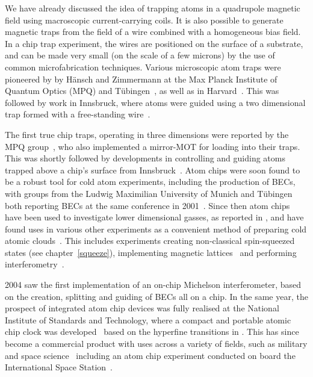 We have already discussed the idea of trapping atoms in a quadrupole magnetic
field using macroscopic current-carrying coils. It is also possible to generate
magnetic traps from the field of a wire combined with a homogeneous bias field.
In a chip trap experiment, the wires are positioned on the surface of a
substrate, and can be made very small (on the scale of a few microns) by the
use of common microfabrication techniques. Various microscopic atom traps were
pioneered by by H\"ansch and Zimmermann at the Max Planck Institute of Quantum
Optics (MPQ) and T\"ubingen~\cite{PhysRevLett.80.1634, PhysRevLett.81.5310}, as
well as in Harvard~\cite{Drindic1998}. This was followed by work in Innsbruck,
where \Li{} atoms were guided using a two dimensional trap formed with a
free-standing wire~\cite{PhysRevLett.82.2014}. 

The first true chip traps, operating in three dimensions were reported by the
MPQ group~\cite{Reichel1999}, who also implemented a mirror-MOT for loading
\esRb{} into their traps. This was shortly followed by developments in
controlling and guiding \Li{} atoms trapped above a chip's
surface from Innsbruck~\cite{Folman2000}.
%
Atom chips were soon found to be a robust tool for cold atom experiments,
including the production of BECs, with groups from the Ludwig Maximilian
University of Munich and T\"ubingen both reporting \esRb{} BECs at the same
conference in 2001~\cite{Hansel2001, Ott2001}. Since then atom chips have been
used to investigate lower dimensional gasses, as reported in
, and have found
uses in various other experiments as a convenient method of preparing cold
atomic clouds~\cite{PhysRevLett.104.073604}.
%
This includes experiments creating non-classical spin-squeezed states (see
chapter~\ref{squeeze}), implementing magnetic lattices~\cite{Gerritsma2007} and
performing interferometry~\cite{Wang2005}.

2004 saw the first implementation of an on-chip Michelson interferometer, based
on the creation, splitting and guiding of BECs all on a chip. In the same year,
the prospect of integrated atom chip devices was fully realised at the National
Institute of Standards and Technology, where a compact and portable atomic chip
clock was developed~\cite{Knappe2004} based on the hyperfine transitions in
\Cs{}. This has since become a commercial product with uses across a variety of
fields, such as military and space science~\cite{RAMIREZMARTINEZ2011247}
including an atom chip experiment conducted on board the International Space
Station~\cite{Frye2021}.

